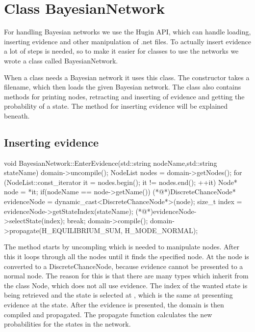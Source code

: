 \section{Class BayesianNetwork}
	For handling Bayesian networks we use the Hugin API, which can handle loading, inserting evidence and other manipulation of .net files. To actually 
	insert evidence a lot of steps is needed, so to make it easier for classes to use the networks we wrote a class called BayesianNetwork.

	When a class needs a Bayesian network it uses this class. The constructor takes a filename, which then loads the given 
	Bayesian network. The class also contains methods for printing nodes, retracting and inserting of evidence and getting the probability of a state. 
	The method for inserting evidence will be explained beneath.
	\subsection*{Inserting evidence}
		\begin{Sourcecode}[caption=EnterEvidence method]
void BayesianNetwork::EnterEvidence(std::string nodeName,std::string stateName)
{
domain->uncompile();
NodeList nodes = domain->getNodes();
for (NodeList::const_iterator it = nodes.begin(); it != nodes.end(); ++it)
{
	Node* node = *it;
	if(nodeName == node->getName())
	{
		(*@\lnote@*)DiscreteChanceNode* evidenceNode = dynamic_cast<DiscreteChanceNode*>(node);
		size_t index = evidenceNode->getStateIndex(stateName);
		(*@\lnote@*)evidenceNode->selectState(index);
		break;
	}
}
domain->compile();
domain->propagate(H_EQUILIBRIUM_SUM, H_MODE_NORMAL);
}
		\end{Sourcecode}
		The method starts by uncompling which is needed to manipulate nodes. After this it loops through all the nodes until it finds the specified 
		node. At  the node is converted to a DiscreteChanceNode, because evidence cannot be presented to a normal node. The reason for this 
		is that there are many types which inherit from the class Node, which does not all use evidence. The index of the wanted state is being 
		retrieved and the state is selected at , which is the same at presenting evidence at the state. After the evidence is presented, the 
		domain is then compiled and propagated. The propagate function calculates the new probabilities for the states in the network.